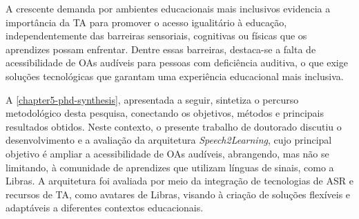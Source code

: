 
A crescente demanda por ambientes educacionais mais inclusivos evidencia a importância da TA para promover o acesso igualitário à educação, independentemente das barreiras sensoriais, cognitivas ou físicas que os aprendizes possam enfrentar. Dentre essas barreiras, destaca-se a falta de acessibilidade de OAs audíveis para pessoas com deficiência auditiva, o que exige soluções tecnológicas que garantam uma experiência educacional mais inclusiva.

A \autoref{chapter5-phd-synthesis}, apresentada a seguir, sintetiza o percurso metodológico desta pesquisa, conectando os objetivos, métodos e principais resultados obtidos. Neste contexto, o presente trabalho de doutorado discutiu o desenvolvimento e a avaliação da arquitetura \textit{Speech2Learning}, cujo principal objetivo é ampliar a acessibilidade de OAs audíveis, abrangendo, mas não se limitando, à comunidade de aprendizes que utilizam línguas de sinais, como a Libras. A arquitetura foi avaliada por meio da integração de tecnologias de ASR e recursos de TA, como avatares de Libras, visando à criação de soluções flexíveis e adaptáveis a diferentes contextos educacionais.

